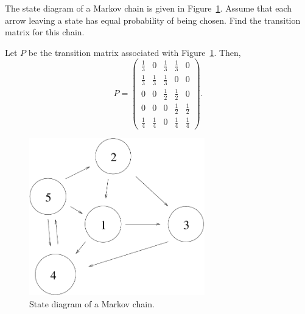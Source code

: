 \documentclass{ximera}
\begin{document}
\begin{exercise} \label{c4.10.3}
The state diagram of a Markov chain is given in Figure~\ref{F:Mchain}.
Assume that each arrow leaving a state has equal probability of being chosen.
Find the transition matrix for this chain.

\begin{solution}

Let $P$ be the transition matrix associated with Figure~\ref{F:Mchain}.
Then,
\[ P = \left(\begin{array}{rrrrr}
\frac{1}{3} & 0 & \frac{1}{3} & \frac{1}{3} & 0 \\
\frac{1}{3} & \frac{1}{3} & \frac{1}{3} & 0 & 0 \\
0 & 0 & \frac{1}{2} & \frac{1}{2} & 0 \\
0 & 0 & 0 & \frac{1}{2} & \frac{1}{2} \\
\frac{1}{4} & \frac{1}{4} & 0 & \frac{1}{4} & \frac{1}{4}
\end{array}\right). \]

\end{solution}
\end{exercise}
\begin{figure}[htb]
        \centerline{%
        \includegraphics[width=3.0in]{../figures/Mchain.pdf}}
        \caption{State diagram of a Markov chain.}
        \label{F:Mchain}
\end{figure}
\end{document}
